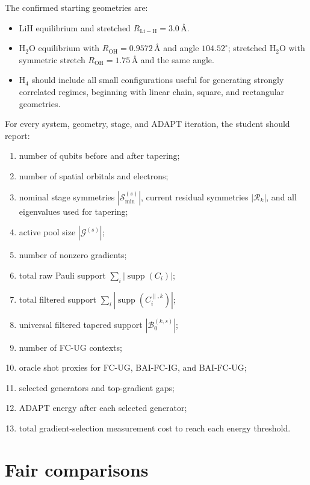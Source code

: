 \documentclass[11pt]{article}
\newcommand{\supp}{\operatorname{supp}}
\begin{document}
The confirmed starting geometries are:
\begin{itemize}[leftmargin=2.0em]
    \item LiH equilibrium and stretched $R_{\mathrm{Li-H}}=3.0\,\text{\AA}$.
    \item H$_2$O equilibrium with $R_{\mathrm{OH}}=0.9572\,\text{\AA}$ and angle $104.52^\circ$; stretched H$_2$O with symmetric stretch $R_{\mathrm{OH}}=1.75\,\text{\AA}$ and the same angle.
    \item H$_4$ should include all small configurations useful for generating strongly correlated regimes, beginning with linear chain, square, and rectangular geometries.
\end{itemize}

For every system, geometry, stage, and ADAPT iteration, the student should report:
\begin{enumerate}[label=(\roman*),leftmargin=2.4em]
    \item number of qubits before and after tapering;
    \item number of spatial orbitals and electrons;
    \item nominal stage symmetries $|\mathcal S_{\min}^{(s)}|$, current residual symmetries $|\mathcal R_k|$, and all eigenvalues used for tapering;
    \item active pool size $|\mathcal G^{(s)}|$;
    \item number of nonzero gradients;
    \item total raw Pauli support $\sum_i |\supp(C_i)|$;
    \item total filtered support $\sum_i |\supp(C_i^{\parallel,k})|$;
    \item universal filtered tapered support $|\mathcal B_0^{(k,s)}|$;
    \item number of FC-UG contexts;
    \item oracle shot proxies for FC-UG, BAI-FC-IG, and BAI-FC-UG;
    \item selected generators and top-gradient gaps;
    \item ADAPT energy after each selected generator;
    \item total gradient-selection measurement cost to reach each energy threshold.
\end{enumerate}

\section{Fair comparisons}
\end{document}
